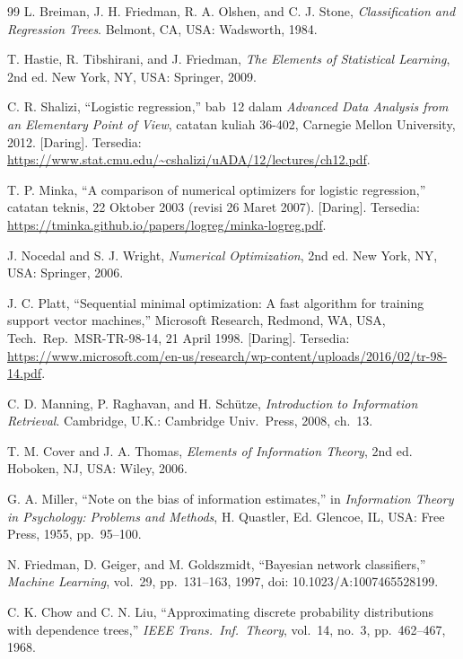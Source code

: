 \begin{thebibliography}{99}
 L. Breiman, J. H. Friedman, R. A. Olshen, and
    C. J. Stone, \textit{Classification and Regression Trees}. Belmont, CA,
    USA: Wadsworth, 1984.

 T. Hastie, R. Tibshirani, and J. Friedman,
    \textit{The Elements of Statistical Learning}, 2nd ed. New York, NY, USA:
    Springer, 2009.

 C. R. Shalizi, ``Logistic regression,'' bab~12
    dalam \textit{Advanced Data Analysis from an Elementary Point of View},
    catatan kuliah 36-402, Carnegie Mellon University, 2012. [Daring].
    Tersedia: \url{https://www.stat.cmu.edu/~cshalizi/uADA/12/lectures/ch12.pdf}.

 T. P. Minka, ``A comparison of numerical optimizers
    for logistic regression,'' catatan teknis, 22 Oktober 2003 (revisi 26 Maret
    2007). [Daring]. Tersedia:
    \url{https://tminka.github.io/papers/logreg/minka-logreg.pdf}.

 J. Nocedal and S. J. Wright, \textit{Numerical
    Optimization}, 2nd ed. New York, NY, USA: Springer, 2006.

 J. C. Platt, ``Sequential minimal optimization: A
    fast algorithm for training support vector machines,'' Microsoft
    Research, Redmond, WA, USA, Tech.\ Rep.\ MSR-TR-98-14, 21 April 1998.
    [Daring]. Tersedia: \url{https://www.microsoft.com/en-us/research/wp-content/uploads/2016/02/tr-98-14.pdf}.

 C. D. Manning, P. Raghavan, and H. Sch\"{u}tze,
    \textit{Introduction to Information Retrieval}. Cambridge, U.K.:
    Cambridge Univ.\ Press, 2008, ch.~13.

 T. M. Cover and J. A. Thomas, \textit{Elements of
    Information Theory}, 2nd ed. Hoboken, NJ, USA: Wiley, 2006.

 G. A. Miller, ``Note on the bias of information
    estimates,'' in \textit{Information Theory in Psychology: Problems and
    Methods}, H. Quastler, Ed. Glencoe, IL, USA: Free Press, 1955,
    pp.~95--100.

 N. Friedman, D. Geiger, and M. Goldszmidt,
    ``Bayesian network classifiers,'' \textit{Machine Learning}, vol.~29,
    pp.~131--163, 1997, doi: 10.1023/A:1007465528199.

 C. K. Chow and C. N. Liu, ``Approximating discrete
    probability distributions with dependence trees,'' \textit{IEEE Trans.\
    Inf.\ Theory}, vol.~14, no.~3, pp.~462--467, 1968.


\end{thebibliography}

